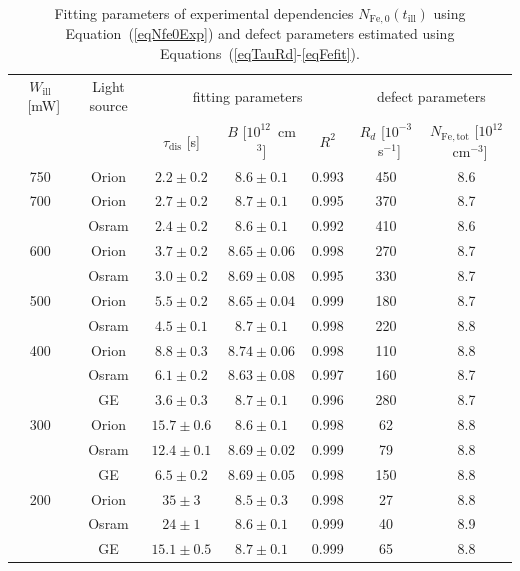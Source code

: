 \documentclass{WileyMSP-template}
\begin{document}
\begin{table}
 \caption{ Fitting parameters of experimental dependencies $N_\mathrm{Fe,0}(t_\mathrm{ill})$
 using Equation~(\ref{eqNfe0Exp}) and defect parameters estimated using Equations~(\ref{eqTauRd}-\ref{eqFefit}).
}
 \label{tb1}
  \begin{tabular}[htbp]{@{}ccccccc@{}}
    \hline
    $W_\mathrm{ill}$~[mW] & Light source & \multicolumn{3}{c}{fitting parameters}&\multicolumn{2}{c}{defect parameters} \\
     &  & $\tau_\mathrm{dis}$ [s] & $B$ [$10^{12}$~cm$^3$] & $R^2$ & $R_d$ [$10^{-3}$~s$^{-1}$] & $N_\mathrm{Fe,tot}$ [$10^{12}$~cm$^{-3}$] \\
    \hline
    750  & Orion  & $2.2\pm0.2$ & $8.6\pm0.1$ & 0.993 &450&8.6\\
    700  & Orion  & $2.7\pm0.2$ & $8.7\pm0.1$ & 0.995 &370&8.7\\
         & Osram  & $2.4\pm0.2$ & $8.6\pm0.1$ & 0.992 &410&8.6\\
    600  & Orion  & $3.7\pm0.2$ & $8.65\pm0.06$ & 0.998&270&8.7 \\
         & Osram  & $3.0\pm0.2$ & $8.69\pm0.08$ & 0.995&330&8.7 \\
    500  & Orion  & $5.5\pm0.2$ & $8.65\pm0.04$ & 0.999&180&8.7 \\
         & Osram  & $4.5\pm0.1$ & $8.7\pm0.1$ & 0.998&220&8.8 \\
    400  & Orion  & $8.8\pm0.3$ & $8.74\pm0.06$ & 0.998&110&8.8 \\
         & Osram  & $6.1\pm0.2$ & $8.63\pm0.08$ & 0.997 &160&8.7\\
         & GE  & $3.6\pm0.3$ & $8.7\pm0.1$ & 0.996 &280&8.7\\
    300  & Orion  & $15.7\pm0.6$ & $8.6\pm0.1$ & 0.998 &62&8.8\\
         & Osram  & $12.4\pm0.1$ & $8.69\pm0.02$ & 0.999&79&8.8 \\
         & GE  & $6.5\pm0.2$ & $8.69\pm0.05$ & 0.998 &150&8.8\\
    200  & Orion  & $35\pm3$ & $8.5\pm0.3$ & 0.998 &27&8.8\\
         & Osram  & $24\pm1$ & $8.6\pm0.1$ & 0.999 &40&8.9\\
         & GE  & $15.1\pm0.5$ & $8.7\pm0.1$ & 0.999 &65&8.8\\
    \hline
  \end{tabular}
\end{table}
\end{document}
